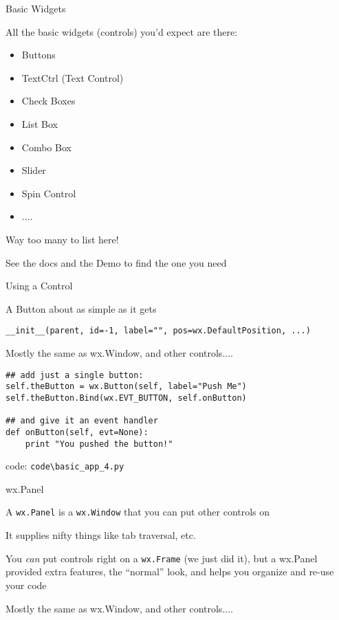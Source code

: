 \documentclass{beamer}
\begin{document}
\begin{frame}[fragile]{Basic Widgets}

\vfill
{\Large All the basic widgets (controls) you'd expect are there:}

\begin{itemize}
 \item Buttons
 \item TextCtrl (Text Control)
 \item Check Boxes
 \item List Box
 \item Combo Box
 \item Slider
 \item Spin Control
 \item ....
\end{itemize}

\vfill
{\Large Way too many to list here!}

\vfill
{\Large See the docs and the Demo to find the one you need}

\end{frame}

\begin{frame}[fragile]{Using a Control}

{\Large A Button about as simple as it gets}

\vfill
{\verb`__init__(parent, id=-1, label="", pos=wx.DefaultPosition, ...)` }

\vfill
{\Large Mostly the same as wx.Window, and other controls....}

\begin{verbatim}
## add just a single button:
self.theButton = wx.Button(self, label="Push Me")
self.theButton.Bind(wx.EVT_BUTTON, self.onButton)
 
## and give it an event handler                                  
def onButton(self, evt=None):
    print "You pushed the button!"
\end{verbatim}

\vfill
code: \verb`code\basic_app_4.py`
\end{frame}

\begin{frame}[fragile]{wx.Panel}

{\Large A \verb`wx.Panel` is a \verb`wx.Window` that you can put other controls on}

\vfill
{\Large It supplies nifty things like tab traversal, etc.}

\vfill
{\Large You \emph{can} put controls right on a \verb`wx.Frame` (we just did it), but a wx.Panel provided extra features, the ``normal'' look, and helps you organize and re-use your code}

\vfill
{\Large Mostly the same as wx.Window, and other controls....}

\end{frame}
\end{document}

